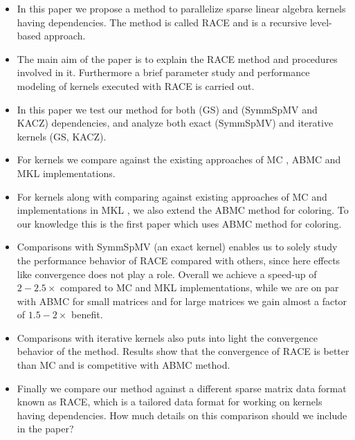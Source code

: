 \begin{itemize}
	\item In this paper we propose a method to parallelize sparse linear algebra kernels having dependencies. The method is called \acrshort{RACE} and is a recursive level-based approach.  
	
	\item The main aim of the paper is to explain the \acrshort{RACE} method and procedures involved in it. Furthermore a brief parameter study and performance modeling of kernels executed with \acrshort{RACE} is carried out.
	
	\item In this paper we test our method for both \DONE (\acrshort{GS}) and \DTWO (\acrshort{SymmSpMV} and \acrshort{KACZ}) dependencies, and analyze both exact (\acrshort{SymmSpMV}) and iterative kernels (\acrshort{GS}, \acrshort{KACZ}).
	
	\item For \DONE kernels we compare against the existing approaches of \acrshort{MC} \cite{MC}, \acrshort{ABMC} \cite{ABMC} and \acrshort{MKL} \cite{MKL} implementations.
	
	\item For \DTWO kernels along with comparing against existing approaches of \acrshort{MC} \cite{feast_mc} and implementations in \acrshort{MKL} \cite{MKL}, we also extend the \acrshort{ABMC} method for \DTWO coloring. To our knowledge this is the first paper which uses \acrshort{ABMC} method for \DTWO coloring.
	
	\item Comparisons with \acrshort{SymmSpMV} (an exact kernel) enables us to solely study the performance behavior of \acrshort{RACE} compared with others, since here effects like convergence does not play a role. Overall we achieve a speed-up of $2-2.5 \times$ compared to \acrshort{MC} and \acrshort{MKL} implementations, while we are on par with \acrshort{ABMC} for small matrices and for large matrices we gain almost a factor of $1.5-2 \times$ benefit. 
	
	\item Comparisons with iterative kernels also puts into light the convergence behavior of the method. Results show that the convergence of \acrshort{RACE} is better than \acrshort{MC} and is competitive with \acrshort{ABMC} method.
	
	\item Finally we compare our method against a different sparse matrix data format known as \acrshort{RACE}, which is a tailored data format for working on kernels having dependencies. How much details on this comparison should we include in the paper? 
\end{itemize}